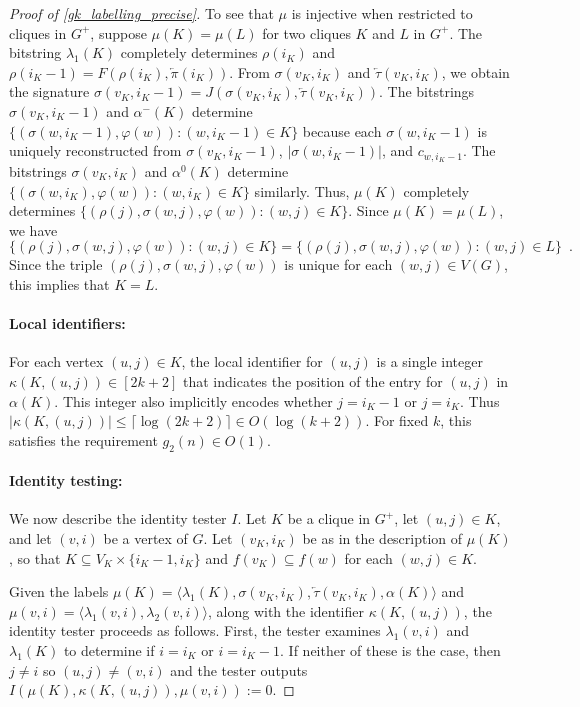 \documentclass{patmorin}
\renewcommand{\le}{\leqslant}
\newcommand{\Oh}{O}
\begin{document}
\begin{proof}[Proof of \cref{gk_labelling_precise}]
  To see that $\mu$ is injective when restricted to cliques in $G^+$, suppose $\mu(K)=\mu(L)$ for two cliques $K$ and $L$ in $G^+$.
  The bitstring $\lambda_1(K)$ completely determines $\rho(i_K)$ and $\rho(i_K-1)=F(\rho(i_K),\overleftarrow{\pi}(i_K))$.
  From $\sigma(v_K,i_K)$ and $\overleftarrow{\tau}(v_K,i_K)$, we obtain the signature $\sigma(v_K,i_K-1)=J(\sigma(v_K,i_K), \overleftarrow{\tau}(v_K,i_K))$. The bitstrings $\sigma(v_K,i_K-1)$ and $\alpha^-(K)$ determine $\{(\sigma(w,i_K-1),\varphi(w)):(w,i_K-1)\in K\}$ because each $\sigma(w,i_K-1)$ is uniquely reconstructed from $\sigma(v_K,i_K-1)$, $|\sigma(w,i_K-1)|$, and $c_{w,i_K-1}$.  The bitstrings $\sigma(v_K,i_K)$ and $\alpha^0(K)$ determine $\{(\sigma(w,i_K),\varphi(w)):(w,i_K)\in K\}$ similarly.  Thus, $\mu(K)$ completely determines $\{(\rho(j),\sigma(w,j),\varphi(w)):(w,j)\in K\}$.  Since $\mu(K)=\mu(L)$, we have
  \[
    \{(\rho(j),\sigma(w,j),\varphi(w)):(w,j)\in K\} = \{(\rho(j),\sigma(w,j),\varphi(w)):(w,j)\in L\} \enspace .
  \]
  Since the triple $(\rho(j),\sigma(w,j),\varphi(w))$ is unique for each $(w,j)\in V(G)$, this implies that $K=L$.


  \paragraph{Local identifiers:}

  For each vertex $(u,j)\in K$, the local identifier for $(u,j)$ is a single integer $\kappa(K,(u,j))\in[2k+2]$ that indicates the position of the entry for $(u,j)$ in $\alpha(K)$.  This integer also implicitly encodes whether $j=i_K-1$  or $j=i_K$.  Thus $|\kappa(K,(u,j))| \le \lceil\log(2k+2)\rceil \in \Oh(\log(k+2))$.  For fixed $k$, this satisfies the requirement $g_2(n)\in\Oh(1)$.

  \paragraph{Identity testing:}

  We now describe the identity tester $I$.  Let $K$ be a clique in $G^+$, let $(u,j)\in K$, and let $(v,i)$ be a vertex of $G$.  Let $(v_K,i_K)$ be as in the description of $\mu(K)$, so that $K\subseteq V_K\times\{i_K-1,i_K\}$ and $f(v_K)\subseteq f(w)$ for each $(w,j)\in K$.   
  
  Given the labels $\mu(K)=\langle\lambda_1(K),\sigma(v_K,i_K),\overleftarrow{\tau}(v_K,i_K),\alpha(K)\rangle$ and $\mu(v,i)=\langle \lambda_1(v,i),\lambda_2(v,i)\rangle$, along with the identifier $\kappa(K,(u,j))$, the identity tester proceeds as follows. First, the tester examines $\lambda_1(v,i)$ and $\lambda_1(K)$ to determine if $i=i_K$ or $i=i_K-1$.  If neither of these is the case, then $j \neq i$ so $(u,j)\neq (v,i)$ and the tester outputs $I(\mu(K),\kappa(K,(u,j)),\mu(v,i)):=0$.


\end{proof}
\end{document}
